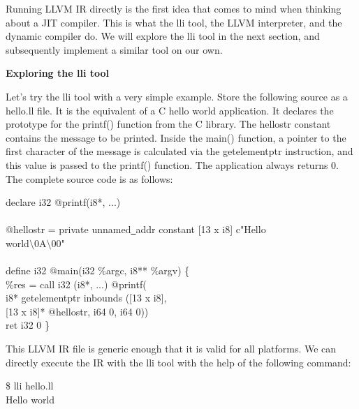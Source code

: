 
Running LLVM IR directly is the first idea that comes to mind when thinking about a JIT compiler. This is what the lli tool, the LLVM interpreter, and the dynamic compiler do. We will explore the lli tool in the next section, and subsequently implement a similar tool on our own.\par

\hspace*{\fill} \par %
\textbf{Exploring the lli tool}

Let's try the lli tool with a very simple example. Store the following source as a hello.ll file. It is the equivalent of a C hello world application. It declares the prototype for the printf() function from the C library. The hellostr constant contains the message to be printed. Inside the main() function, a pointer to the first character of the message is calculated via the getelementptr instruction, and this value is passed to the printf() function. The application always returns 0. The complete source code is as follows:\par

\begin{tcolorbox}[colback=white,colframe=black]
declare i32 @printf(i8*, ...) \\
\\
@hellostr = private unnamed\underline{~}addr constant [13 x i8] c"Hello  \\
\hspace*{8cm}world$\setminus$0A$\setminus$00" \\
\\
define i32 @main(i32 \%argc, i8** \%argv) \{ \\
\hspace*{0.5cm}\%res = call i32 (i8*, ...) @printf( \\
\hspace*{3.5cm}i8* getelementptr inbounds ([13 x i8], \\
\hspace*{4.5cm}[13 x i8]* @hellostr, i64 0, i64 0)) \\
\hspace*{0.5cm}ret i32 0
\}
\end{tcolorbox}

This LLVM IR file is generic enough that it is valid for all platforms. We can directly execute the IR with the lli tool with the help of the following command:\par

\begin{tcolorbox}[colback=white,colframe=black]
\$ lli hello.ll \\
Hello world
\end{tcolorbox}

